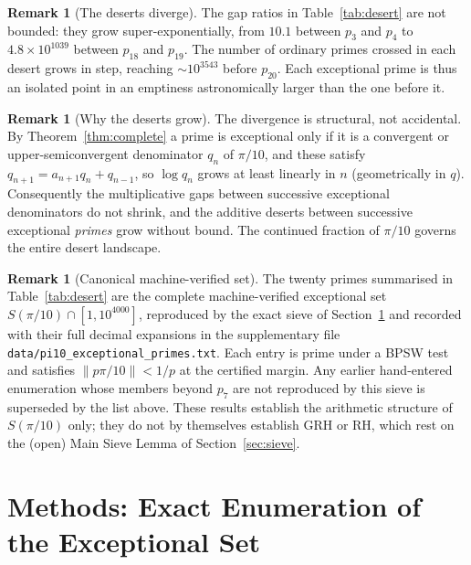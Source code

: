 \documentclass[11pt,letterpaper]{article}
\theoremstyle{definition}
\newtheorem{remark}[theorem]{Remark}
\begin{document}
\begin{remark}[The deserts diverge]
The gap ratios in Table~\ref{tab:desert} are not bounded: they grow
super-exponentially, from $10.1$ between $p_3$ and $p_4$ to $4.8\times10^{1039}$
between $p_{18}$ and $p_{19}$.  The number of ordinary primes crossed in each
desert grows in step, reaching $\sim 10^{3543}$ before $p_{20}$.  Each
exceptional prime is thus an isolated point in an emptiness astronomically
larger than the one before it.
\end{remark}

\begin{remark}[Why the deserts grow]
The divergence is structural, not accidental.  By Theorem~\ref{thm:complete} a
prime is exceptional only if it is a convergent or upper-semiconvergent
denominator $q_n$ of $\pi/10$, and these satisfy $q_{n+1} = a_{n+1}q_n +
q_{n-1}$, so $\log q_n$ grows at least linearly in $n$ (geometrically in $q$).
Consequently the multiplicative gaps between successive exceptional denominators
do not shrink, and the additive deserts between successive exceptional
\emph{primes} grow without bound.  The continued fraction of $\pi/10$ governs the
entire desert landscape.
\end{remark}

\begin{remark}[Canonical machine-verified set]
The twenty primes summarised in Table~\ref{tab:desert} are the complete
machine-verified exceptional set $S(\pi/10)\cap[1,10^{4000}]$, reproduced by the
exact sieve of Section~\ref{sec:methods} and recorded with their full decimal
expansions in the supplementary file
\texttt{data/pi10\_exceptional\_primes.txt}.  Each entry is prime under a BPSW
test and satisfies $\|p\pi/10\| < 1/p$ at the certified margin.  Any earlier
hand-entered enumeration whose members beyond $p_7$ are not reproduced by this
sieve is superseded by the list above.  These results establish the arithmetic
structure of $S(\pi/10)$ only; they do not by themselves establish GRH or RH,
which rest on the (open) Main Sieve Lemma of Section~\ref{sec:sieve}.
\end{remark}

\section{Methods: Exact Enumeration of the Exceptional Set}\label{sec:methods}
\end{document}
